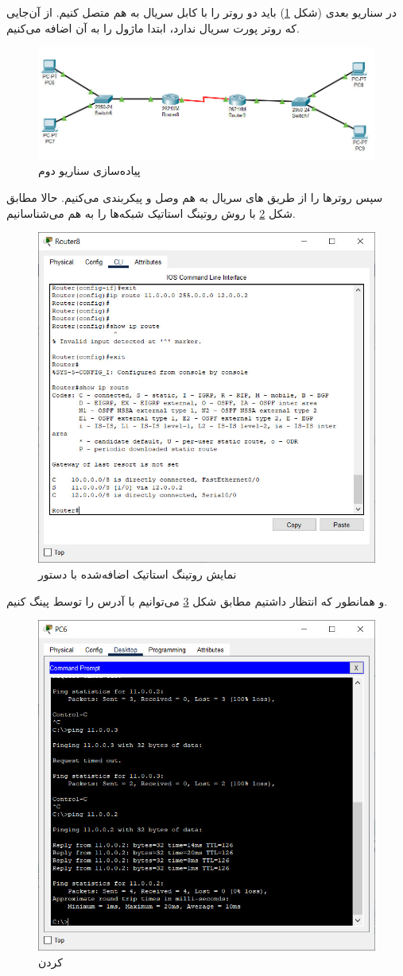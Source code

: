 \documentclass{article}
\newcommand{\code}[1]{\colorbox{codegray}{\texttt{#1}}}
\begin{document}
در سناریو بعدی (شکل \ref{fig:scenario-2}) باید دو روتر را با کابل سریال به هم متصل کنیم. از آن‌جایی که روتر  پورت سریال ندارد، ابتدا ماژول  را به آن اضافه می‌کنیم.
\begin{figure}[h!]
	\centering
	\includegraphics[width=0.6\columnwidth]{figs/scenario-2.jpg}
	\caption{پیاده‌سازی سناریو دوم}
	\label{fig:scenario-2}
\end{figure}

سپس روترها را از طریق های سریال به هم وصل و پیکربندی می‌کنیم. 
حالا مطابق شکل \ref{fig:serial-route} با روش روتینگ استاتیک شبکه‌ها را به هم می‌شناسانیم.

\begin{figure}[h!]
	\centering
	\includegraphics[width=0.6\columnwidth]{figs/serial-route.jpg}
	\caption{نمایش روتینگ استاتیک اضافه‌شده با دستور \code{}}
	\label{fig:serial-route}
\end{figure}

و همانطور که انتظار داشتیم مطابق شکل \ref{fig:ping-2} می‌توانیم  با آدرس  را توسط  پینگ کنیم.
\begin{figure}[h!]
	\centering
	\includegraphics[width=0.6\columnwidth]{figs/ping-2.jpg}
	\caption{ کردن }
	\label{fig:ping-2}
\end{figure}
\end{document}

